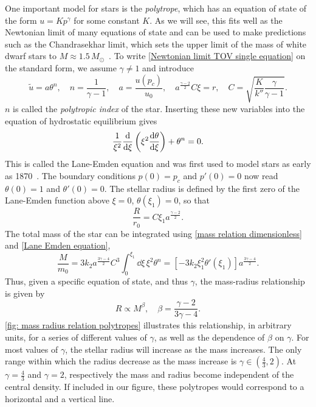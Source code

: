 One important model for stars is the \emph{polytrope}, which has an equation of state of the form $u = K p^\gamma$ for some constant $K$.
As we will see, this fits well as the Newtonian limit of many equations of state and can be used to make predictions such as the Chandrasekhar limit, which sets the upper limit of the mass of white dwarf stars to $M \approx 1.5 \, M_\odot$~\autocite{chandrasekharHighlyCollapsedConfigurations1935,glendenningCompactStarsNuclear2012}.
To write \autoref{Newtonian limit TOV single equation} on the standard form, we assume $\gamma \neq 1$ and introduce
%
\begin{equation}
    \tilde u = a \theta^{n}, \quad 
    n = \frac{1}{\gamma - 1}, \quad 
    a = \frac{u(p_c)}{u_0}, 
    \quad a^{\frac{\gamma - 2}{2}}C \xi = r, \quad 
    C =\sqrt{ \frac{K}{k''} \frac{\gamma}{\gamma - 1}}.
\end{equation}
%
$n$ is called the \emph{polytropic index} of the star.
Inserting these new variables into the equation of hydrostatic equilibrium gives
%
\begin{equation}
    \label{Lane Emden equation}
    \frac{1}{\xi^2} \odv{}{\xi} \left(\xi^2 \odv{\theta}{\xi} \right) + \theta^n = 0.
\end{equation}
%
This is called the Lane-Emden equation and was first used to model stars as early as 1870~\autocite{laneTheoreticalTemperatureSun1870}.
The boundary conditions $p(0) = p_c$ and $p'(0) = 0$ now read $\theta(0) = 1$ and $\theta'(0) = 0$.
The stellar radius is defined by the first zero of the Lane-Emden function above $\xi = 0$, $\theta(\xi_1) = 0$, so that
%
\begin{equation}
    \label{Radius polytrope}
    \frac{R}{r_0}= C \xi_1  a^{\frac{\gamma-2}{2}}. 
\end{equation}
%
The total mass of the star can be integrated using \autoref{mass relation dimensionless} and \autoref{Lane Emden equation},
%
\begin{equation}
    \frac{M}{m_0} = 3 k_2 a^{\frac{3\gamma-4}{2}} C^3 \int^{\xi_1}_0 \dd \xi \, \xi^2 \theta^n = [-3 k_2 \xi_1^2 \theta'(\xi_1)] a^{\frac{3\gamma-4}{2}}.
\end{equation}
%
Thus, given a specific equation of state, and thus $\gamma$, the mass-radius relationship is given by
%
\begin{equation}
    \label{Polytrope mass radius relationship}
    R \propto M^\beta, \quad \beta = {\frac{\gamma - 2}{3 \gamma - 4}}.
\end{equation}
%
\autoref{fig: mass radius relation polytropes} illustrates this relationship, in arbitrary units, for a series of different values of $\gamma$, as well as the dependence of $\beta$ on $\gamma$.
For most values of $\gamma$, the stellar radius will increase as the mass increases.
The only range within which the radius decrease as the mass increase is $\gamma \in \left(\frac{4}{3}, 2 \right)$.
At $\gamma = \frac{4}{3}$ and $\gamma = 2$, respectively the mass and radius become independent of the central density.
If included in our figure, these polytropes would correspond to a horizontal and a vertical line.


